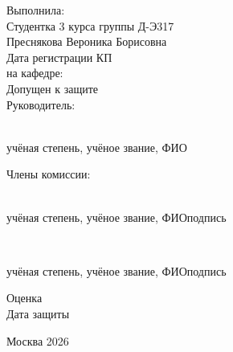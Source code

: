 \documentclass[a4paper,14pt]{extreport}
\begin{document}
\begin{titlepage}
\hfill
\begin{minipage}{0.52\textwidth}
  \fontsize{12pt}{14.5pt}\selectfont
  Выполнила:\\[1mm]
  Студентка 3 курса группы Д-Э317\\[1mm]
  Преснякова Вероника Борисовна\\[3mm]
  Дата регистрации КП\\
  на кафедре: \underline{\hspace{38mm}}\\[3.5mm]
  Допущен к защите\\[1mm]
  Руководитель:\\[2mm]
  \underline{\hspace{72mm}}\\
  \vspace{-2.5mm}
  {\fontsize{8.5pt}{10pt}\selectfont\hspace*{12mm} учёная степень, учёное звание, ФИО\par}\vspace{3mm}
  Члены комиссии:\\[2mm]
  \underline{\hspace{47mm}}\;\underline{\hspace{20mm}}\\
  \vspace{-2.5mm}
  {\fontsize{8.5pt}{10pt}\selectfont учёная степень, учёное звание, ФИО\hfill подпись\hspace*{2mm}\par}\vspace{2mm}
  \underline{\hspace{47mm}}\;\underline{\hspace{20mm}}\\
  \vspace{-2.5mm}
  {\fontsize{8.5pt}{10pt}\selectfont учёная степень, учёное звание, ФИО\hfill подпись\hspace*{2mm}\par}\vspace{3mm}
  Оценка \underline{\hspace{51mm}}\\[2.5mm]
  Дата защиты \underline{\hspace{43mm}}
\end{minipage}

\vfill

\begin{center}
  \fontsize{14pt}{17pt}\selectfont
  Москва 2026
\end{center}
\end{titlepage}
\end{document}

